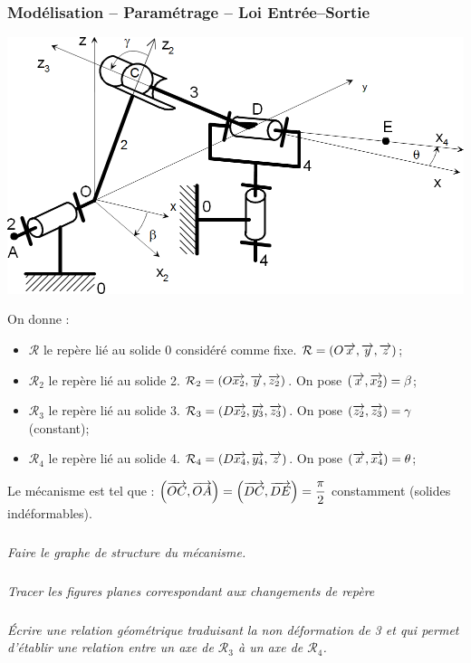 \documentclass[10pt,fleqn]{article} %
\begin{document}
\begin{multicols}{2}
\subsubsection*{Modélisation -- Paramétrage -- Loi Entrée--Sortie}
\begin{center}
\includegraphics[width=.9\linewidth]{images/Fig08_05}
\end{center}
On donne : 
\begin{itemize}
\item $\mathcal{R}$ le repère lié au solide 0 considéré comme fixe. $\mathcal{R} = \left( O\overrightarrow{x},\overrightarrow{y},\overrightarrow{z}\right)$;
\item $\mathcal{R}_2$ le repère lié au solide 2. $\mathcal{R}_2 = \left( O\overrightarrow{x_2},\overrightarrow{y},\overrightarrow{z_2}\right)$. On pose $\left( \overrightarrow{x},\overrightarrow{x_2}\right) = \beta$;
\item $\mathcal{R}_3$ le repère lié au solide 3. $\mathcal{R}_3 = \left( D\overrightarrow{x_2},\overrightarrow{y_3},\overrightarrow{z_3}\right)$. On pose $\left( \overrightarrow{z_2},\overrightarrow{z_3}\right) = \gamma$ (constant);
\item $\mathcal{R}_4$ le repère lié au solide 4. $\mathcal{R}_4 = \left( D\overrightarrow{x_4},\overrightarrow{y_4},\overrightarrow{z}\right)$. On pose $\left( \overrightarrow{x},\overrightarrow{x_4}\right) = \theta$;
\end{itemize}

Le mécanisme est tel que : $\left( \overrightarrow{OC},\overrightarrow{OA}\right) = \left( \overrightarrow{DC},\overrightarrow{DE}\right) = \dfrac{\pi}{2}$ constamment (solides indéformables).

\subparagraph{}
\textit{Faire le graphe de structure du mécanisme.}


\subparagraph{}
\textit{Tracer les figures planes correspondant aux changements de repère}


\subparagraph{}
\textit{Écrire une relation géométrique traduisant la non déformation de 3 et qui permet d'établir une relation entre un axe de $\mathcal{R}_3$  à un axe de $\mathcal{R}_4$.}


\end{multicols}
\end{document}
